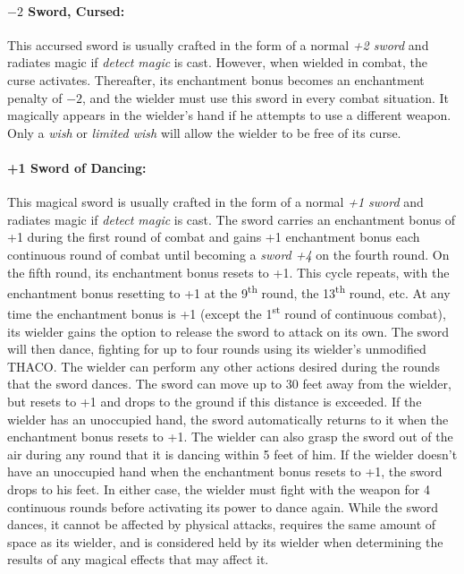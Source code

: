 \begin{multicols}{2}
\paragraph{$-2$ Sword, Cursed:} This accursed sword is usually crafted in the form of a normal \textit{+2 sword} and radiates magic if \textit{detect magic} is cast.  However, when wielded in combat, the curse activates.  Thereafter, its enchantment bonus becomes an enchantment penalty of $-2$, and the wielder must use this sword in every combat situation.  It magically appears in the wielder's hand if he attempts to use a different weapon.  Only a \textit{wish} or \textit{limited wish} will allow the wielder to be free of its curse.



\paragraph{+1 Sword of Dancing:} This magical sword is usually crafted in the form of a normal \textit{+1 sword} and radiates magic if \textit{detect magic} is cast.  The sword carries an enchantment bonus of +1 during the first round of combat and gains +1 enchantment bonus each continuous round of combat until becoming a \textit{sword +4} on the fourth round.  On the fifth round, its enchantment bonus resets to +1.  This cycle repeats, with the enchantment bonus resetting to +1 at the 9\textsuperscript{th} round, the 13\textsuperscript{th} round, etc.  At any time the enchantment bonus is +1 (except the 1\textsuperscript{st} round of continuous combat), its wielder gains the option to release the sword to attack on its own.  The sword will then dance, fighting for up to four rounds using its wielder's unmodified THACO.  The wielder can perform any other actions desired during the rounds that the sword dances.  The sword can move up to 30 feet away from the wielder, but resets to +1 and drops to the ground if this distance is exceeded.  If the wielder has an unoccupied hand, the sword automatically returns to it when the enchantment bonus resets to +1.  The wielder can also grasp the sword out of the air during any round that it is dancing within 5 feet of him.  If the wielder doesn't have an unoccupied hand when the enchantment bonus resets to +1, the sword drops to his feet.  In either case, the wielder must fight with the weapon for 4 continuous rounds before activating its power to dance again.  While the sword dances, it cannot be affected by physical attacks, requires the same amount of space as its wielder, and is considered held by its wielder when determining the results of any magical effects that may affect it.  


\end{multicols}
